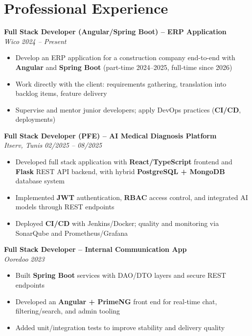 \documentclass[10pt,a4paper]{article}
\begin{document}
\vspace{6pt}

\section*{Professional Experience}
{\small

\textbf{Full Stack Developer (Angular/Spring Boot) -- ERP Application}\\[1pt]
\textit{Wico} \hfill \textit{2024 -- Present}
\begin{itemize}
  \item Develop an ERP application for a construction company end-to-end with \textbf{Angular} and \textbf{Spring Boot} (part-time 2024--2025, full-time since 2026)
  \item Work directly with the client: requirements gathering, translation into backlog items, feature delivery
  \item Supervise and mentor junior developers; apply DevOps practices (\textbf{CI/CD}, deployments)
\end{itemize}

\vspace{3pt}
\textbf{Full Stack Developer (PFE) -- AI Medical Diagnosis Platform}\\[1pt]
\textit{Itserv, Tunis} \hfill \textit{02/2025 -- 08/2025}
\begin{itemize}
  \item Developed full stack application with \textbf{React/TypeScript} frontend and \textbf{Flask} REST API backend, with hybrid \textbf{PostgreSQL + MongoDB} database system
  \item Implemented \textbf{JWT} authentication, \textbf{RBAC} access control, and integrated AI models through REST endpoints
  \item Deployed \textbf{CI/CD} with Jenkins/Docker; quality and monitoring via SonarQube and Prometheus/Grafana
\end{itemize}

\vspace{3pt}
\textbf{Full Stack Developer -- Internal Communication App}\\[1pt]
\textit{Ooredoo} \hfill \textit{2023}
\begin{itemize}
  \item Built \textbf{Spring Boot} services with DAO/DTO layers and secure REST endpoints
  \item Developed an \textbf{Angular + PrimeNG} front end for real-time chat, filtering/search, and admin tooling
  \item Added unit/integration tests to improve stability and delivery quality
\end{itemize}

}
\end{document}
